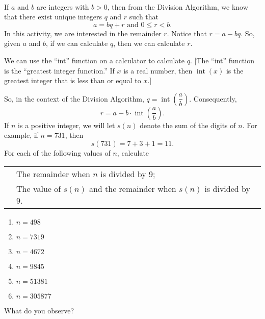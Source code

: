 \begin{previewactivity} \label{PA:remainderdivide9} \hfill \\
If  $a$  and  $b$  are integers with  $b > 0$, then from the Division Algorithm, we know that there exist unique integers  $q$  and  $r$ such that  
\[
a = bq + r \text{ and } 0 \leq r < b.
\]
In this activity, we are interested in the remainder  $r$.  Notice that  $r = a - bq$.  So, given $a$ and $b$, if we can calculate  $q$, then we can calculate  $r$.  

We can use the ``int'' function on a calculator to calculate  $q$.  [The ``int'' function is the ``greatest integer function.''  If  $x$  is a real number, then  
$\operatorname{int}( x )$  is the greatest integer that is less than or equal to  $x$.]

So, in the context of the Division Algorithm,  
$q = \operatorname{int} \!\left( {\dfrac{a}{b}} \right)$.  Consequently,
\[
r = a - b \cdot \operatorname{int} \!\left( {\frac{a}{b}} \right).
\]
If  $n$  is a positive integer, we will let  $s\left( n \right)$  denote the sum of the digits of  $n$.  For example,  if  $n = 731$, then
\[
s( {731} ) = 7 + 3 + 1 = 11.
\]
\noindent
For each of the following values of  $n$, calculate
\vskip6pt
\begin{tabular}{ l l}
  & The remainder when $n$ is divided by 9; \\
  & The value of $s( n )$ and the remainder when $s( n )$ is divided by 9.  \\ 
\end{tabular}
%
\begin{multicols}{3}
\begin{enumerate}
\item $n=498$
\item $n=7319$
\item $n=4672$
\item $n=9845$
\item $n=51381$
\item $n=305877$
\end{enumerate}
\end{multicols}
\noindent
What do you observe?
\end{previewactivity}
\hbreak

\endinput


